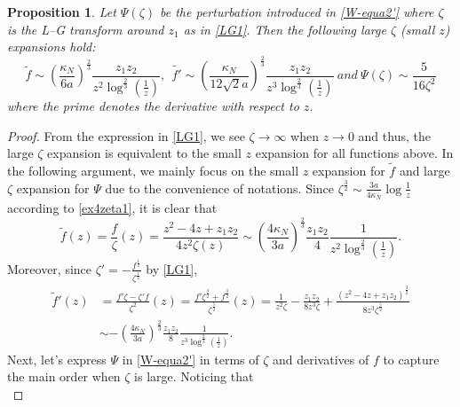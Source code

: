 \documentclass[11pt]{article}
\newtheorem{proposition}[theorem]{Proposition}
\numberwithin{equation}{section}%
\numberwithin{theorem}{section}
\begin{document}
\begin{proposition}\label{Psi}
     Let $\Psi(\zeta)$ be the perturbation introduced in \eqref{W-equa2'} where $\zeta$ is the L--G transform around $z_1$ as in \eqref{LG1}. Then the following large $\zeta$ (small $z$) expansions hold:
     \begin{equation}\label{order of pert}
     \tilde{f}\sim \left(\frac{\kappa_N}{6a}\right)^\frac{2}{3}\frac{z_1z_2}{z^2\log^\frac{2}{3}\left(\frac{1}{z}\right)},~~\tilde{f'}\sim \left(\frac{\kappa_N}{12\sqrt 2a}\right)^\frac{2}{3}\frac{z_1z_2}{z^3\log^\frac{2}{3}\left(\frac{1}{z}\right)}~and~\Psi(\zeta)\sim\frac{5}{16\zeta^2}
     \end{equation}
     where the prime denotes the derivative with respect to $z$.
\end{proposition}
\begin{proof}
    From the expression in \eqref{LG1}, we see $\zeta\rightarrow\infty$ when $z\rightarrow0$ and thus, the large $\zeta$ expansion is equivalent to the small $z$ expansion for all functions above. In the following argument, we mainly focus on the small $z$ expansion for $\tilde{f}$ and large $\zeta$ expansion for $\Psi$ due to the convenience of notations. Since $\zeta^\frac{3}{2}\sim\frac{3a}{4\kappa_N}\log\frac{1}{z}$ according to \eqref{ex4zeta1}, it is clear that 
    \begin{equation}\label{B4tildef}
        \tilde{f}(z)=\frac{f}{\zeta}(z)=\frac{z^2-4z+z_1z_2}{4z^2\zeta(z)}\sim\left(\frac{4\kappa_N}{3a}\right)^\frac{2}{3}\frac{z_1z_2}{4}\frac{1}{z^2\log^\frac{2}{3}\left(\frac{1}{z}\right)}.
    \end{equation}
Moreover, since $\zeta'=-\frac{f^\frac{1}{2}}{\zeta^\frac{1}{2}}$ by \eqref{LG1},
\begin{equation}\label{B4tildef'}
\begin{split}
       \tilde{f}'(z)&=\frac{f'\zeta-\zeta'f}{\zeta^2}(z)=\frac{f'\zeta^\frac{3}{2}+f^\frac{3}{2}}{\zeta^\frac{5}{2}}(z)=\frac{1}{z^2\zeta}-\frac{z_1z_2}{8z^3\zeta}+\frac{\left(z^2-4z+z_1z_2\right)^\frac{3}{2}}{8z^3\zeta^\frac{5}{2}}\\
       &\sim-\left(\frac{4\kappa_N}{3a}\right)^\frac{2}{3}\frac{z_1z_2}{8}\frac{1}{z^3\log^\frac{2}{3}\left(\frac{1}{z}\right)}.
\end{split}
\end{equation}
Next, let's express $\Psi$ in \eqref{W-equa2'} in terms of $\zeta$ and derivatives of $f$ to capture the main order when $\zeta$ is large. Noticing that
\begin{equation*}

\end{equation*}
\end{proof}
\end{document}
